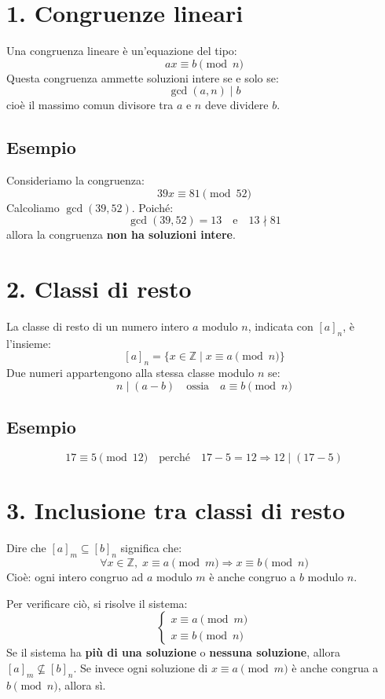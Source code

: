 \documentclass[a4paper,12pt]{article}
\begin{document}
\section*{1. Congruenze lineari}

Una congruenza lineare è un'equazione del tipo:
\[
ax \equiv b \pmod{n}
\]
Questa congruenza ammette soluzioni intere se e solo se:
\[
\gcd(a, n) \mid b
\]
cioè il massimo comun divisore tra \(a\) e \(n\) deve dividere \(b\).

\subsection*{Esempio}
Consideriamo la congruenza:
\[
39x \equiv 81 \pmod{52}
\]
Calcoliamo \(\gcd(39, 52)\). Poiché:
\[
\gcd(39, 52) = 13
\quad \text{e} \quad
13 \nmid 81
\]
allora la congruenza \textbf{non ha soluzioni intere}.

\section*{2. Classi di resto}

La classe di resto di un numero intero \(a\) modulo \(n\), indicata con \([a]_n\), è l'insieme:
\[
[a]_n = \{x \in \mathbb{Z} \mid x \equiv a \pmod{n} \}
\]
Due numeri appartengono alla stessa classe modulo \(n\) se:
\[
n \mid (a - b) \quad \text{ossia} \quad a \equiv b \pmod{n}
\]

\subsection*{Esempio}
\[
17 \equiv 5 \pmod{12} \quad \text{perché} \quad 17 - 5 = 12 \Rightarrow 12 \mid (17 - 5)
\]

\section*{3. Inclusione tra classi di resto}

Dire che \([a]_m \subseteq [b]_n\) significa che:
\[
\forall x \in \mathbb{Z}, \; x \equiv a \pmod{m} \Rightarrow x \equiv b \pmod{n}
\]
Cioè: ogni intero congruo ad \(a\) modulo \(m\) è anche congruo a \(b\) modulo \(n\).

Per verificare ciò, si risolve il sistema:
\[
\begin{cases}
x \equiv a \pmod{m} \\
x \equiv b \pmod{n}
\end{cases}
\]
Se il sistema ha \textbf{più di una soluzione} o \textbf{nessuna soluzione}, allora \([a]_m \not\subseteq [b]_n\).  
Se invece ogni soluzione di \(x \equiv a \pmod{m}\) è anche congrua a \(b \pmod{n}\), allora sì.
\end{document}
